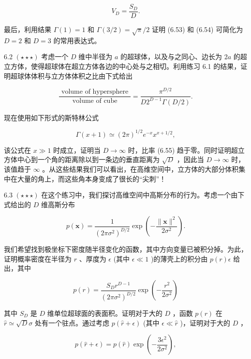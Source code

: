 \documentclass[10pt]{report}
\begin{document}
\[
{V}_{D} = \frac{{S}_{D}}{D}. \tag{6.54}
\]

最后，利用结果 \(\Gamma \left( 1\right)  = 1\) 和 \(\Gamma \left( {3/2}\right)  = \sqrt{\pi }/2\) 证明 (6.53) 和 (6.54) 可简化为 \(D = 2\) 和 \(D = 3\) 的常用表达式。

6.2 \(\left( {\star  \star   \star  }\right)\) 考虑一个 \(D\) 维中半径为 \(a\) 的超球体，以及与之同心、边长为 \({2a}\) 的超立方体，使得超球体在超立方体各边的中心处与之相切。利用练习 6.1 的结果，证明超球体体积与立方体体积之比由下式给出

\[
\frac{\text{ volume of hypersphere }}{\text{ volume of cube }} = \frac{{\pi }^{D/2}}{D{2}^{D - 1}\Gamma \left( {D/2}\right) }. \tag{6.55}
\]

现在使用如下形式的斯特林公式

\[
\Gamma \left( {x + 1}\right)  \simeq  {\left( 2\pi \right) }^{1/2}{e}^{-x}{x}^{x + 1/2}, \tag{6.56}
\]

该公式在 \(x \gg  1\) 时成立，证明当 \(D \rightarrow  \infty\) 时，比率 (6.55) 趋于零。同时证明超立方体中心到一个角的距离除以到一条边的垂直距离为 \(\sqrt{D}\) ，因此当 \(D \rightarrow  \infty\) 时，该值趋于 \(\infty\) 。从这些结果我们可以看出，在高维空间中，立方体的大部分体积集中在大量的角上，而这些角本身变成了很长的“尖刺”！

6.3 \(\left( {\star  \star   \star  }\right)\) 在这个练习中，我们探讨高维空间中高斯分布的行为。考虑一个由下式给出的 \(D\) 维高斯分布

\[
p\left( \mathbf{x}\right)  = \frac{1}{{\left( 2\pi {\sigma }^{2}\right) }^{D/2}}\exp \left( {-\frac{\parallel \mathbf{x}{\parallel }^{2}}{2{\sigma }^{2}}}\right) . \tag{6.57}
\]

我们希望找到极坐标下密度随半径变化的函数，其中方向变量已被积分掉。为此，证明概率密度在半径为 \(r\) 、厚度为 \(\epsilon\) (其中 \(\epsilon  \ll  1\) )的薄壳上的积分由 \(p\left( r\right) \epsilon\) 给出，其中

\[
p\left( r\right)  = \frac{{S}_{D}{r}^{D - 1}}{{\left( 2\pi {\sigma }^{2}\right) }^{D/2}}\exp \left( {-\frac{{r}^{2}}{2{\sigma }^{2}}}\right)  \tag{6.58}
\]

其中 \({S}_{D}\) 是 \(D\) 维单位超球面的表面积。证明对于大的 \(D\) ，函数 \(p\left( r\right)\) 在 \(\widehat{r} \simeq  \sqrt{D}\sigma\) 处有一个驻点。通过考虑 \(p\left( {\widehat{r} + \epsilon }\right)\) (其中 \(\epsilon  \ll  \widehat{r}\) )，证明对于大的 \(D\) ，

\[
p\left( {\widehat{r} + \epsilon }\right)  = p\left( \widehat{r}\right) \exp \left( {-\frac{3{\epsilon }^{2}}{2{\sigma }^{2}}}\right) , \tag{6.59}
\]
\end{document}

